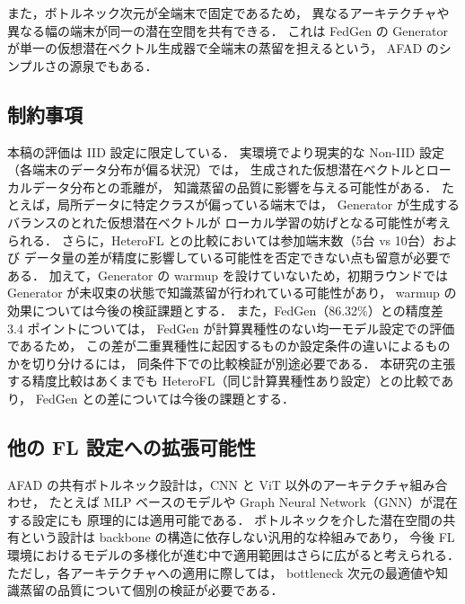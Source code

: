 また，ボトルネック次元が全端末で固定であるため，
異なるアーキテクチャや異なる幅の端末が同一の潜在空間を共有できる．
これは FedGen の Generator が単一の仮想潜在ベクトル生成器で全端末の蒸留を担えるという，
AFAD のシンプルさの源泉でもある．

\subsection{制約事項}

本稿の評価は IID 設定に限定している．
実環境でより現実的な Non-IID 設定（各端末のデータ分布が偏る状況）では，
生成された仮想潜在ベクトルとローカルデータ分布との乖離が，
知識蒸留の品質に影響を与える可能性がある．
たとえば，局所データに特定クラスが偏っている端末では，
Generator が生成するバランスのとれた仮想潜在ベクトルが
ローカル学習の妨げとなる可能性が考えられる．
さらに，HeteroFL との比較においては参加端末数（5台 vs 10台）および
データ量の差が精度に影響している可能性を否定できない点も留意が必要である．
加えて，Generator の warmup を設けていないため，初期ラウンドでは
Generator が未収束の状態で知識蒸留が行われている可能性があり，
warmup の効果については今後の検証課題とする．
また，FedGen（86.32\%）との精度差 3.4 ポイントについては，
FedGen が計算異種性のない均一モデル設定での評価であるため，
この差が二重異種性に起因するものか設定条件の違いによるものかを切り分けるには，
同条件下での比較検証が別途必要である．
本研究の主張する精度比較はあくまでも HeteroFL（同じ計算異種性あり設定）との比較であり，
FedGen との差については今後の課題とする．

\subsection{他の FL 設定への拡張可能性}

AFAD の共有ボトルネック設計は，CNN と ViT 以外のアーキテクチャ組み合わせ，
たとえば MLP ベースのモデルや Graph Neural Network（GNN）が混在する設定にも
原理的には適用可能である．
ボトルネックを介した潜在空間の共有という設計は backbone の構造に依存しない汎用的な枠組みであり，
今後 FL 環境におけるモデルの多様化が進む中で適用範囲はさらに広がると考えられる．
ただし，各アーキテクチャへの適用に際しては，
bottleneck 次元の最適値や知識蒸留の品質について個別の検証が必要である．

